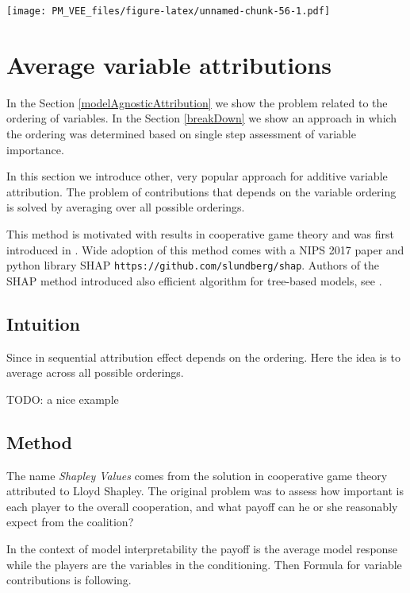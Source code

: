 \documentclass[12pt,]{krantz}
\theoremstyle{definition}
\theoremstyle{definition}
\theoremstyle{definition}
\theoremstyle{remark}
\begin{document}
\texttt{[image: PM\_VEE\_files/figure-latex/unnamed-chunk-56-1.pdf]}

\hypertarget{shapley}{%
\section{Average variable attributions}\label{shapley}}

In the Section \ref{modelAgnosticAttribution} we show the problem
related to the ordering of variables. In the Section \ref{breakDown} we
show an approach in which the ordering was determined based on single
step assessment of variable importance.

In this section we introduce other, very popular approach for additive
variable attribution. The problem of contributions that depends on the
variable ordering is solved by averaging over all possible orderings.

This method is motivated with results in cooperative game theory and was
first introduced in \citep{Strumbelj2014}. Wide adoption of this method
comes with a NIPS 2017 paper \citep{SHAP} and python library SHAP
\texttt{https://github.com/slundberg/shap}. Authors of the SHAP method
introduced also efficient algorithm for tree-based models, see
\citep{TreeSHAP}.

\hypertarget{intuition-7}{%
\subsection{Intuition}\label{intuition-7}}

Since in sequential attribution effect depends on the ordering. Here the
idea is to average across all possible orderings.

TODO: a nice example

\hypertarget{method-7}{%
\subsection{Method}\label{method-7}}

The name \emph{Shapley Values} comes from the solution in cooperative
game theory attributed to Lloyd Shapley. The original problem was to
assess how important is each player to the overall cooperation, and what
payoff can he or she reasonably expect from the coalition?
\citep{shapleybook1952}

In the context of model interpretability the payoff is the average model
response while the players are the variables in the conditioning. Then
Formula for variable contributions is following.
\end{document}
